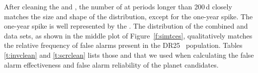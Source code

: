 
After cleaning the  and , the number of  at periods longer than 200\,d closely matches the size and shape of the \opstce{} distribution, except for the one-year spike. The one-year spike is well represented by the .  The distribution of the combined \invtce{} and \scrtce{} data sets, as shown in the middle plot of Figure~\ref{f:simtces}, qualitatively matches the relative frequency of false alarms present in the DR25 \opstce\ population. Tables\,\ref{t:invclean} and \ref{t:scrclean} lists those  and  that we used when calculating the false alarm effectiveness and false alarm reliability of the planet candidates.


